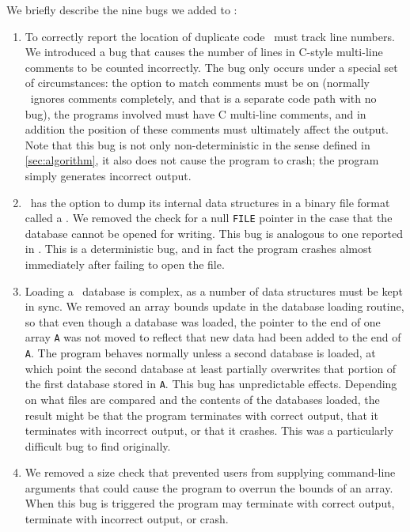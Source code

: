 We briefly describe the nine bugs we added to \moss:
\begin{enumerate}
\item To correctly report the location of duplicate code \moss\ must
track line numbers.  We introduced a bug that causes the number of
lines in C-style multi-line comments to be counted incorrectly.  The
bug only occurs under a special set of circumstances: the option to
match comments must be on (normally \moss\ ignores comments
completely, and that is a separate code path with no bug), the
programs involved must have C multi-line comments, and in addition the
position of these comments must ultimately affect the output.
Note that this bug is not only non-deterministic in
the sense defined in \autoref{sec:algorithm}, it also does not
cause the program to crash; the program simply generates incorrect
output.

\item \moss\ has the option to dump its internal data structures in a
binary file format called a .  We removed the check for a
null {\tt FILE} pointer in the case that the database cannot be opened
for writing.  This bug is analogous to one reported in \ccrypt
\cite{Selinger:2003:cqual}.  This is a deterministic bug, and in fact the
program crashes almost immediately after failing to open the file.

\item Loading a \moss\ database is complex, as a number of data
structures must be kept in sync.  We removed an array bounds update
in the database loading routine, so that even though a database was
loaded, the pointer to the end of one array {\tt A} was not moved to
reflect that new data had been added to the end of {\tt A}. The
program behaves normally unless a second database is loaded, at which
point the second database at least partially overwrites that portion
of the first database stored in {\tt A}.  This bug has unpredictable
effects.  Depending on what files are compared and the contents of the
databases loaded, the result might be that the program terminates with
correct output, that it terminates with incorrect output, or that it
crashes.  This was a particularly difficult bug to find originally.

\item We removed a size check that prevented users from supplying command-line arguments
that could cause the program to overrun the bounds of an array.  When
this bug is triggered the program may terminate with correct output,
terminate with incorrect output, or crash.


\end{enumerate}
